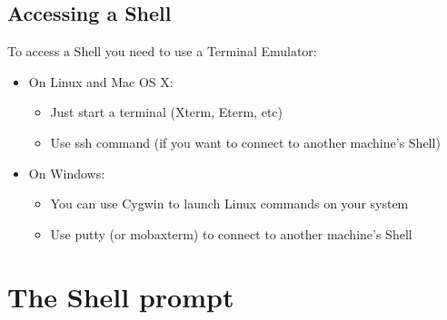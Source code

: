 \documentclass{beamer}[10pt, usepdftitle=false, handout]
\begin{document}
	\subsection{Accessing a Shell}
	
	\begin{frame}

	To access a Shell you need to use a Terminal Emulator:
	\vspace*{1em}
	\begin{itemize}
	\item{On Linux and Mac OS X: 
		\begin{itemize}
		\item{Just start a terminal (Xterm, Eterm, etc)}
		\item{Use ssh command (if you want to connect to another machine's Shell)}
		\end{itemize}
	}
	\item{On Windows:
		\begin{itemize}
		\item{You can use Cygwin to launch Linux commands on your system}
		\item{Use putty (or mobaxterm) to connect to another machine's Shell}
		\end{itemize}
	}	
	\end{itemize}		
	
	\end{frame}	

	\section{The Shell prompt}
\end{document}
